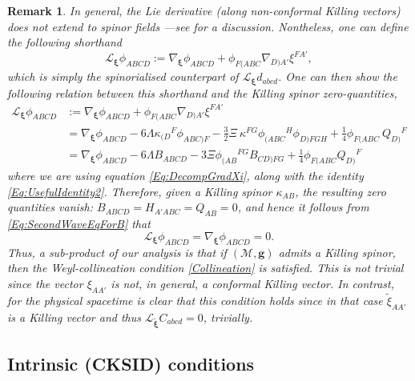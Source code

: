 \documentclass[10pt,a4paper]{article}
\theoremstyle{plain}
\newtheorem{remark}{Remark}
\def\bmg{{\bm g}}
\newcounter{mnotecount}%
\newcommand{\mnotex}[1]%
{\protect{\stepcounter{mnotecount}}$^{\mbox{\footnotesize $\bullet$\themnotecount}}$ 
\marginpar{%
\raggedright\tiny\em
$\!\!\!\!\!\!\,\bullet$\themnotecount: #1} }
\begin{document}
\begin{remark}
  \emph{
  In general, the Lie derivative (along non-conformal Killing vectors) 
  does not extend to spinor fields   ---see
  \cite{PenRin86} for a discussion. Nontheless, one can
  define the following shorthand
\[ \mathcal{L}_{\bm\xi}\phi_{ABCD} := \nabla_{\bm\xi}\phi_{ABCD} + \phi_{F(ABC}\nabla_{D)A'}\xi^{FA'},\]
which is simply the spinorialised counterpart of
$\mathcal{L}_{\bm\xi}d_{abcd}$. One can then show the following
relation between this shorthand and the Killing spinor zero-quantities,
\begin{align*}
    \mathcal{L}_{\bm\xi}\phi_{ABCD}&:= \nabla_{\bm\xi}\phi_{ABCD}
    + \phi_{F(ABC}\nabla_{D)A'}\xi^{FA'} \\ &=
    \nabla_{\bm\xi}\phi_{ABCD}-6\Lambda \kappa_{(D}{}^{F} \phi_{ABC)F}
    - \tfrac{3}{2} \Xi \ \kappa^{FG} \phi_{(ABC}{}^{H} \phi_{D)FGH} +
    \tfrac{1}{4} \phi_{F(ABC} \ Q_{D)}{}^{F}\\ &=
    \nabla_{\bm\xi}\phi_{ABCD}-6\Lambda B_{ABCD} - 3\Xi
    \phi_{(AB}{}^{FG}B_{CD)FG} + \tfrac{1}{4}\phi_{F(ABC}Q_{D)}{}^F
\end{align*}
where we are using equation \eqref{Eq:DecompGradXi}, along with the identity
\eqref{Eq:UsefulIdentity2}. Therefore, given a Killing spinor $\kappa_{AB}$,
the resulting zero quantities vanish:
$B_{ABCD}=H_{A'ABC}=Q_{AB}=0$, and hence it follows from
\eqref{Eq:SecondWaveEqForB} that
\begin{equation}\mathcal{L}_{\bm\xi}\phi_{ABCD} = \nabla_{\bm\xi}\phi_{ABCD} =0. \label{Collineation}
\end{equation}
Thus, a sub-product of our analysis is that if $(\mathcal{M},\bmg)$
admits a Killing spinor, then the Weyl-collineation condition
\eqref{Collineation} is satisfied.  This is not trivial since the
vector $\xi_{AA'}$ is not, in general, a
conformal Killing vector. In contrast,
for the physical spacetime is clear that this condition holds 
since in that case $\tilde{\xi}_{AA'}$ is a Killing vector and thus
$\mathcal{L}_{\bm{\tilde{\xi}}}C_{abcd}=0$, trivially.
}
\end{remark}

\subsection{Intrinsic (CKSID) conditions}
\label{IntrinsicCKSID}
\end{document}
